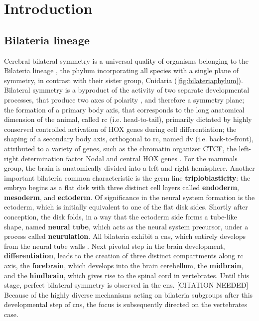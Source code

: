 \chapter{Introduction}
\label{chap:introduction}

\section{Bilateria lineage}
Cerebral bilateral symmetry is a universal quality of organisms belonging to the Bilateria lineage \cite{Concha2012}\cite{Corballis2009}, the phylum incorporating all species with a single plane of symmetry, in contrast with their sister group, Cnidaria (\autoref{fig:bilateriaphylum}). Bilateral symmetry is a byproduct of the activity of two separate developmental processes, that produce two axes of polarity \cite{Finnerty2003}, and therefore a symmetry plane; the formation of a primary body axis, that corresponds to the long anatomical dimension of the animal, called \acf{rc} (i.e. head-to-tail), primarily dictated by highly conserved controlled activation of HOX genes during cell differentiation; the shaping of a secondary body axis, orthogonal to \ac{rc}, named \acf{dv} (i.e. back-to-front), attributed to a variety of genes,  such as the chromatin organizer CTCF, the left-right determination factor Nodal and central HOX genes \cite{Heger2020}.  For the mammals group, the brain is anatomically divided into a left and right hemisphere.  Another important bilateria common characteristic is the germ line \textbf{triploblasticity}: the embryo begins as a flat disk with three distinct cell layers called \textbf{endoderm}, \textbf{mesoderm}, and \textbf{ectoderm}. Of significance in the neural system formation is the ectoderm, which is initially equivalent to one of the flat disk sides. Shortly after conception, the disk folds, in a way that the ectoderm side forms a tube-like shape, named \textbf{neural tube}, which acts as the neural system precursor, under a process called \textbf{neurulation}. All bilateria exhibit a \ac{cns}, which entirely develops from the neural tube walls \cite{F.Bear2016a}. Next pivotal step in the brain development, \textbf{differentiation}, leads to the creation of three distinct compartments along \acf{rc} axis, the \textbf{forebrain}, which develops into the brain cerebellum, the \textbf{midbrain}, and the \textbf{hindbrain}, which gives rise to the spinal cord in vertebrates. Until this stage, perfect bilateral symmetry is observed in the \ac{cns}. [CITATION NEEDED] Because of the highly diverse mechanisms acting on bilateria subgroups after this developmental step of \ac{cns},  the focus is subsequently directed on the vertebrates case. 


